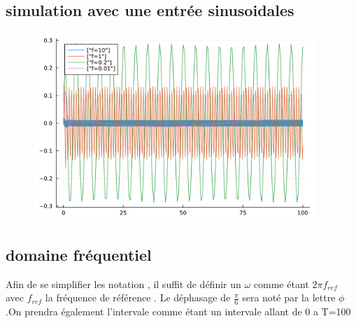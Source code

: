 \documentclass[11pt,a4paper]{article}
\begin{document}
\subsection{simulation avec une entrée sinusoidales}
\begin{figure}[!h]
  \includegraphics[width=0.95\textwidth]{../code/jlplots/Q2_4.pdf}
  \caption{}\label{fig:}
\end{figure}

\subsection{domaine fréquentiel}

Afin de se simplifier les notation , il suffit de définir un $\omega$ comme étant $2\pi f_{ref}$ avec $f_{ref}$ la fréquence de référence . Le déphasage de $\frac \pi 6$ sera noté par la lettre $\phi$.On prendra également l'intervale comme étant un intervale allant de 0 a T=100 \\
\end{document}
